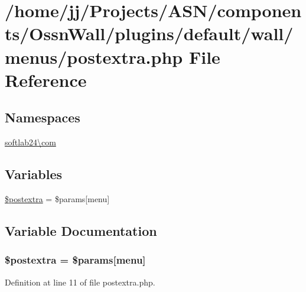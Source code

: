 \hypertarget{postextra_8php}{}\section{/home/jj/\+Projects/\+A\+S\+N/components/\+Ossn\+Wall/plugins/default/wall/menus/postextra.php File Reference}
\label{postextra_8php}
\subsection*{Namespaces}
\begin{DoxyCompactItemize}
\item 
 \hyperlink{namespacesoftlab24_1_1com}{softlab24\textbackslash{}com}
\end{DoxyCompactItemize}
\subsection*{Variables}
\begin{DoxyCompactItemize}
\item 
\hyperlink{postextra_8php_a20bdea63b18b2861e10b3a5f45f11455}{\$postextra} = \$params\mbox{[}\textquotesingle{}menu\textquotesingle{}\mbox{]}
\end{DoxyCompactItemize}


\subsection{Variable Documentation}
\subsubsection[{\texorpdfstring{\$postextra}{$postextra}}]{\setlength{\rightskip}{0pt plus 5cm}\$postextra = \$params\mbox{[}\textquotesingle{}menu\textquotesingle{}\mbox{]}}\hypertarget{postextra_8php_a20bdea63b18b2861e10b3a5f45f11455}{}\label{postextra_8php_a20bdea63b18b2861e10b3a5f45f11455}


Definition at line 11 of file postextra.\+php.

